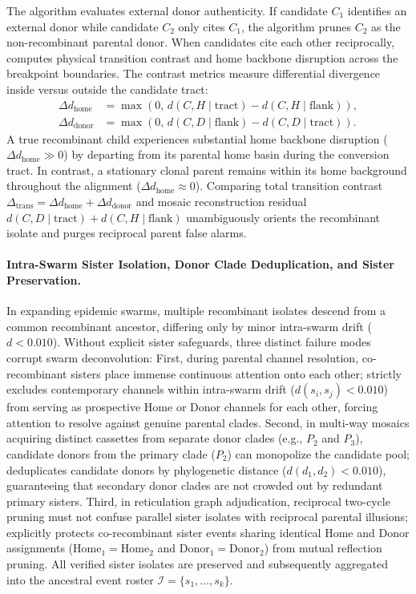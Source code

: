 The algorithm evaluates external donor authenticity.
If candidate $C_1$ identifies an external donor while candidate $C_2$ only cites $C_1$, the algorithm prunes $C_2$ as the non-recombinant parental donor.
When candidates cite each other reciprocally, \RhizAeon computes physical transition contrast and home backbone disruption across the breakpoint boundaries.
The contrast metrics measure differential divergence inside versus outside the candidate tract:
\begin{align}
\Delta d_{\text{home}} &= \max\left(0, \, d(C, H \mid \text{tract}) - d(C, H \mid \text{flank})\right), \label{eq:methods_delta_home} \\
\Delta d_{\text{donor}} &= \max\left(0, \, d(C, D \mid \text{flank}) - d(C, D \mid \text{tract})\right). \label{eq:methods_delta_donor}
\end{align}
A true recombinant child experiences substantial home backbone disruption ($\Delta d_{\text{home}} \gg 0$) by departing from its parental home basin during the conversion tract.
In contrast, a stationary clonal parent remains within its home background throughout the alignment ($\Delta d_{\text{home}} \approx 0$).
Comparing total transition contrast $\Delta_{\text{trans}} = \Delta d_{\text{home}} + \Delta d_{\text{donor}}$ and mosaic reconstruction residual $d(C, D \mid \text{tract}) + d(C, H \mid \text{flank})$ unambiguously orients the recombinant isolate and purges reciprocal parent false alarms.

\paragraph{Intra-Swarm Sister Isolation, Donor Clade Deduplication, and Sister Preservation.}
In expanding epidemic swarms, multiple recombinant isolates descend from a common recombinant ancestor, differing only by minor intra-swarm drift ($d < 0.010$).
Without explicit sister safeguards, three distinct failure modes corrupt swarm deconvolution:
First, during parental channel resolution, co-recombinant sisters place immense continuous attention onto each other; \RhizAeon strictly excludes contemporary channels within intra-swarm drift ($d(s_i, s_j) < 0.010$) from serving as prospective Home or Donor channels for each other, forcing attention to resolve against genuine parental clades.
Second, in multi-way mosaics acquiring distinct cassettes from separate donor clades (e.g., $P_2$ and $P_3$), candidate donors from the primary clade ($P_2$) can monopolize the candidate pool; \RhizAeon deduplicates candidate donors by phylogenetic distance ($d(d_1, d_2) < 0.010$), guaranteeing that secondary donor clades are not crowded out by redundant primary sisters.
Third, in reticulation graph adjudication, reciprocal two-cycle pruning must not confuse parallel sister isolates with reciprocal parental illusions; \RhizAeon explicitly protects co-recombinant sister events sharing identical Home and Donor assignments ($\text{Home}_1 = \text{Home}_2$ and $\text{Donor}_1 = \text{Donor}_2$) from mutual reflection pruning.
All verified sister isolates are preserved and subsequently aggregated into the ancestral event roster $\mathcal{I} = \{s_1, \dots, s_k\}$.

